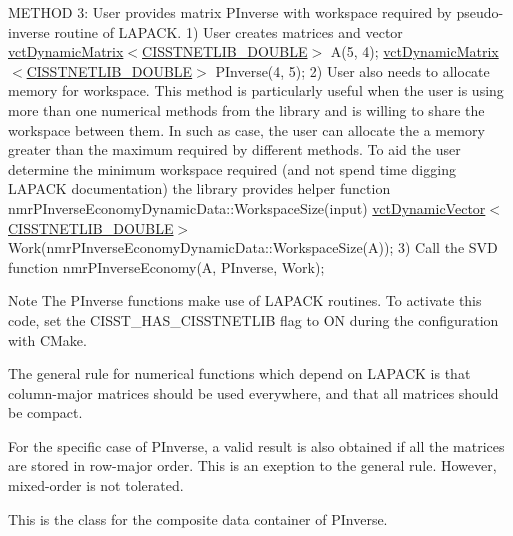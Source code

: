 M\-E\-T\-H\-O\-D 3\-: User provides matrix P\-Inverse with workspace required by pseudo-\/inverse routine of L\-A\-P\-A\-C\-K. 1) User creates matrices and vector \hyperlink{classvct_dynamic_matrix}{vct\-Dynamic\-Matrix$<$\-C\-I\-S\-S\-T\-N\-E\-T\-L\-I\-B\-\_\-\-D\-O\-U\-B\-L\-E$>$} A(5, 4); \hyperlink{classvct_dynamic_matrix}{vct\-Dynamic\-Matrix$<$\-C\-I\-S\-S\-T\-N\-E\-T\-L\-I\-B\-\_\-\-D\-O\-U\-B\-L\-E$>$} P\-Inverse(4, 5); 2) User also needs to allocate memory for workspace. This method is particularly useful when the user is using more than one numerical methods from the library and is willing to share the workspace between them. In such as case, the user can allocate the a memory greater than the maximum required by different methods. To aid the user determine the minimum workspace required (and not spend time digging L\-A\-P\-A\-C\-K documentation) the library provides helper function nmr\-P\-Inverse\-Economy\-Dynamic\-Data\-::\-Workspace\-Size(input) \hyperlink{classvct_dynamic_vector}{vct\-Dynamic\-Vector$<$\-C\-I\-S\-S\-T\-N\-E\-T\-L\-I\-B\-\_\-\-D\-O\-U\-B\-L\-E$>$} Work(nmr\-P\-Inverse\-Economy\-Dynamic\-Data\-::\-Workspace\-Size(\-A)); 3) Call the S\-V\-D function nmr\-P\-Inverse\-Economy(\-A, P\-Inverse, Work);

\begin{DoxyNote}{Note}
The P\-Inverse functions make use of L\-A\-P\-A\-C\-K routines. To activate this code, set the C\-I\-S\-S\-T\-\_\-\-H\-A\-S\-\_\-\-C\-I\-S\-S\-T\-N\-E\-T\-L\-I\-B flag to O\-N during the configuration with C\-Make. 

The general rule for numerical functions which depend on L\-A\-P\-A\-C\-K is that column-\/major matrices should be used everywhere, and that all matrices should be compact. 

For the specific case of P\-Inverse, a valid result is also obtained if all the matrices are stored in row-\/major order. This is an exeption to the general rule. However, mixed-\/order is not tolerated.
\end{DoxyNote}
This is the class for the composite data container of P\-Inverse. 

